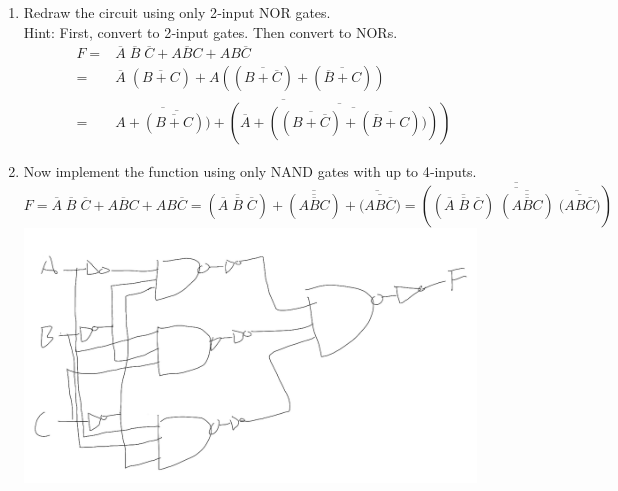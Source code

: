 \documentclass[12pt,letterpaper,titlepage]{report}
\begin{document}
\begin{enumerate}[label=\alph*)]
	\item Redraw the circuit using only 2‐input NOR gates. \\
	Hint: First, convert to 2‐input gates.  Then convert to NORs.  
		\begin{align*}
	F =& \overline{A}\;\overline{B}\;\overline{C} + A\overline{B}C + AB\overline{C}
	\\=& \overline{A}\;(\overline{B+C}) + A((\overline{B+\overline{C}}) + (\overline{\overline{B}+C}))
	\\=& \overline{\overline{A+\overline{(\overline{B+C}))}} + (\overline{\overline{A}+(\overline{(\overline{B+\overline{C}}) + (\overline{\overline{B}+C}))})})}
	\end{align*}
	\item Now implement the function using only NAND gates with up to 4‐inputs. \\
$
	F = \overline{A}\;\overline{B}\;\overline{C} + A\overline{B}C + AB\overline{C}
	  = ( \overline{
				\overline{A}\;\overline{B}\;\overline{C}
			}
		 ) + \overline{(
		 	\overline{
		 		A\overline{B}C
		 	}
		 )} + \overline{(
		 	\overline{
			 	AB\overline{C}
			}
		 })
	  = \overline{(\overline{
		 ( \overline{
				\overline{A}\;\overline{B}\;\overline{C}
			}
		 ) \; \overline{(
		 	\overline{
		 		A\overline{B}C
		 	}
		 )} \; \overline{(
		 	\overline{
			 	AB\overline{C}
			}
		 })
		 })}
$\\
	\includegraphics[width=12cm]{hw3p5c}


\end{enumerate}
\pagebreak
\end{document}
